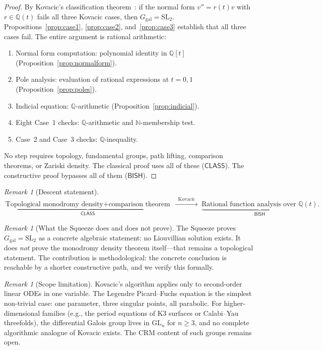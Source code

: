 \documentclass[11pt]{article}
\theoremstyle{plain}
\theoremstyle{definition}
\theoremstyle{remark}
\newtheorem{remark}[theorem]{Remark}
\newcommand{\N}{\mathbb{N}}
\newcommand{\Q}{\mathbb{Q}}
\newcommand{\GL}{\mathrm{GL}}
\newcommand{\SL}{\mathrm{SL}}
\newcommand{\Ggal}{G_{\mathrm{gal}}}
\newcommand{\BISH}{\mathsf{BISH}}
\newcommand{\CLASS}{\mathsf{CLASS}}
\begin{document}
\begin{proof}
By Kovacic's classification theorem~\cite{Kovacic1986}: if the normal form $v'' = r(t)v$ with $r \in \Q(t)$ fails all three Kovacic cases, then $\Ggal = \SL_2$.
Propositions~\ref{prop:case1}, \ref{prop:case2}, and~\ref{prop:case3} establish that all three cases fail.
The entire argument is rational arithmetic:
\begin{enumerate}
  \item Normal form computation: polynomial identity in $\Q[t]$ (Proposition~\ref{prop:normalform}).
  \item Pole analysis: evaluation of rational expressions at $t = 0, 1$ (Proposition~\ref{prop:poles}).
  \item Indicial equation: $\Q$-arithmetic (Proposition~\ref{prop:indicial}).
  \item Eight Case~1 checks: $\Q$-arithmetic and $\N$-membership test.
  \item Case~2 and Case~3 checks: $\Q$-inequality.
\end{enumerate}
No step requires topology, fundamental groups, path lifting, comparison theorems, or Zariski density.
The classical proof uses all of these ($\CLASS$).
The constructive proof bypasses all of them ($\BISH$).
\end{proof}

\begin{remark}[Descent statement]
\[
  \underbrace{\text{Topological monodromy density} + \text{comparison theorem}}_{\CLASS}
  \;\xrightarrow{\;\;\text{Kovacic}\;\;}\;
  \underbrace{\text{Rational function analysis over } \Q(t)}_{\BISH}.
\]
\end{remark}

\begin{remark}[What the Squeeze does and does not prove]
The Squeeze proves $\Ggal = \SL_2$ as a concrete algebraic statement: no Liouvillian solution exists.
It does \emph{not} prove the monodromy density theorem itself---that remains a topological statement.
The contribution is methodological: the concrete conclusion is reachable by a shorter constructive path, and we verify this formally.
\end{remark}

\begin{remark}[Scope limitation]\label{rem:scope}
Kovacic's algorithm applies only to second-order linear ODEs in one variable.
The Legendre Picard--Fuchs equation is the simplest non-trivial case: one parameter, three singular points, all parabolic.
For higher-dimensional families (e.g., the period equations of K3 surfaces or Calabi--Yau threefolds), the differential Galois group lives in $\GL_n$ for $n \geq 3$, and no complete algorithmic analogue of Kovacic exists.
The CRM content of such groups remains open.
\end{remark}
\end{document}
